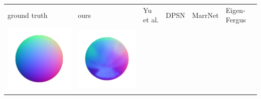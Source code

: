 \begin{tabularx}{\linewidth}{@{}Y@{}Y@{}Y@{}Y@{}Y@{}Y@{}}
ground truth & ours & Yu et al. & DPSN & MarrNet & Eigen-Fergus \\
\includegraphics[width=\linewidth]{semisynthetic/20160617_13_gt.png} &
\includegraphics[width=\linewidth]{semisynthetic/20160617_13_ours_out.png} &

\end{tabularx}
